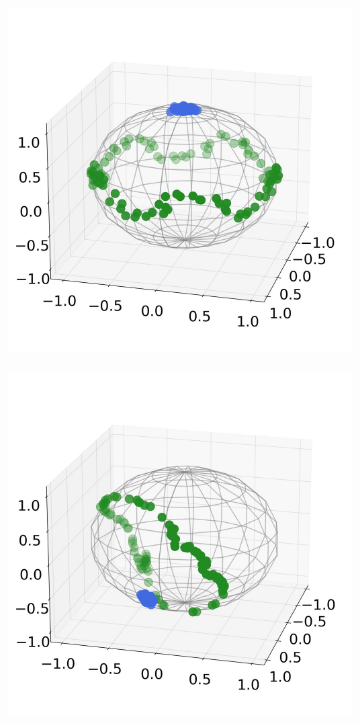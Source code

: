\documentclass[10pt,twocolumn,letterpaper]{article}
\begin{document}
   \begin{figure}[t]

     \centering
     \begin{subfigure}{0.49\linewidth}
       \includegraphics[width=\linewidth,trim={0 1.5cm 0 1.5cm},clip]{figures/experiments/sim_new/X_train.jpeg}
       \caption{}
       \label{fig:sim1-a}
     \end{subfigure}
     \hfill
     \begin{subfigure}{0.49\linewidth}
       \includegraphics[width=\linewidth,trim={0 1.5cm 0 1.5cm},clip]{figures/experiments/sim_new/init.jpeg}

\end{subfigure}
\end{figure}
\end{document}
